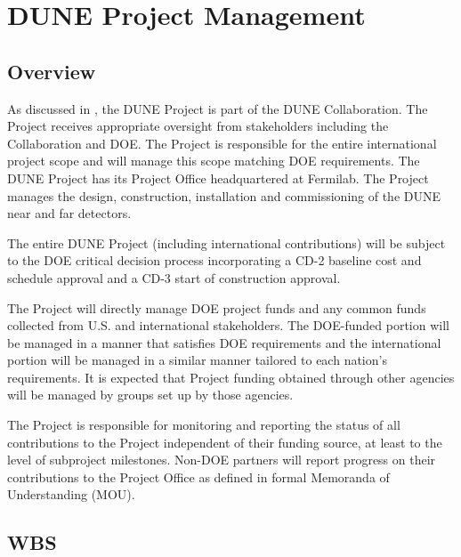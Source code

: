 \chapter{DUNE Project Management}
\label{ch:detectors-pm}


\section{Overview}

As discussed in \volintro, the DUNE Project is part of the DUNE
Collaboration. The Project receives appropriate oversight from
stakeholders including the Collaboration and DOE. The Project is
responsible for the entire international project scope and will manage
this scope matching DOE requirements. The DUNE Project has its Project Office
headquartered at Fermilab.
The Project manages the design, construction, installation and
commissioning of the DUNE near and far detectors.

The entire DUNE Project (including international contributions)
will be subject to the DOE critical decision process incorporating a
CD-2 baseline cost and schedule approval and a CD-3 start of construction approval.

The Project will directly manage DOE project funds and any common
funds collected from U.S. and international stakeholders. The
DOE-funded portion will be managed in a manner that satisfies DOE
requirements and the international portion will be managed in a
similar manner tailored to each nation's requirements. It is expected
that Project funding obtained through other agencies will be managed
by groups set up by those agencies.

The Project is responsible for monitoring and reporting the status of
all contributions to the Project independent of their funding source,
at least to the level of subproject milestones.  Non-DOE partners will
report progress on their contributions to the Project Office as
defined in formal Memoranda of Understanding (MOU).

\section[Work Breakdown Structure (WBS)]{WBS}

